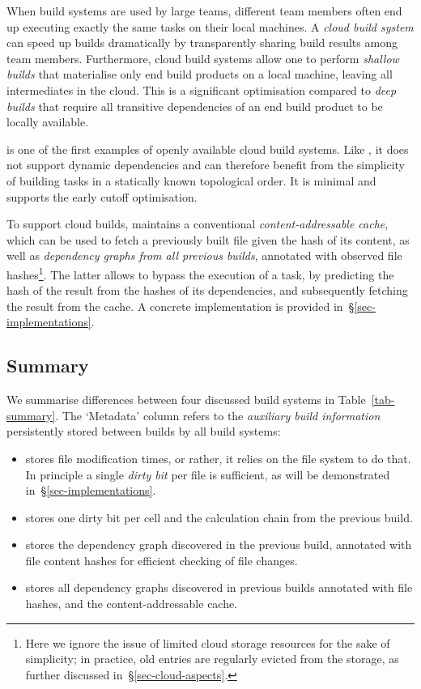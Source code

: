 When build systems are used by large teams, different team members
often end up executing exactly the same tasks on their local machines.
A \emph{cloud build system} can speed up builds dramatically by
transparently sharing build results among team members. Furthermore, cloud
build systems allow one to perform \emph{shallow builds} that materialise
only end build products on a local machine, leaving all intermediates in the
cloud. This is a significant optimisation compared to \emph{deep builds}
that require all transitive dependencies of an end build product to be
locally available. %

\Bazel is one of the first examples of openly available cloud build systems.
Like \Make, it does not support dynamic dependencies and can therefore benefit
from the simplicity of building tasks in a statically known topological order.
It is minimal and supports the early cutoff optimisation.

To support cloud builds, \Bazel maintains a conventional \emph{content-addressable
cache}, which can be used to fetch a previously built file given the hash of its
content, as well as \emph{dependency graphs from all previous builds}, annotated
with observed file hashes\footnote{Here we ignore the issue of limited cloud
storage resources for the sake of simplicity; in practice, old entries are
regularly evicted from the storage, as further discussed
in~\S\ref{sec-cloud-aspects}.}. The latter allows to bypass the execution of
a task, by predicting the hash of the result from the hashes of its dependencies,
and subsequently fetching the result from the cache. A concrete implementation is
provided in~\S\ref{sec-implementations}.

\subsection{Summary}
\label{sec-background-summary}

We summarise differences between four discussed build systems in
Table~\ref{tab-summary}. The `Metadata' column refers to the \emph{auxiliary
build information} persistently stored between builds by all build systems:
\begin{itemize}
    \item \Make stores file modification times, or rather, it relies on the file
    system to do that. In principle a single \emph{dirty bit} per file is
    sufficient, as will be demonstrated in~\S\ref{sec-implementations}.
    \item \Excel stores one dirty bit per cell and the calculation chain from
    the previous build.
    \item \Shake stores the dependency graph discovered in the previous build,
    annotated with file content hashes for efficient checking of file changes.
    \item \Bazel stores all dependency graphs discovered in previous builds
    annotated with file hashes, and the content-addressable cache.
\end{itemize}

